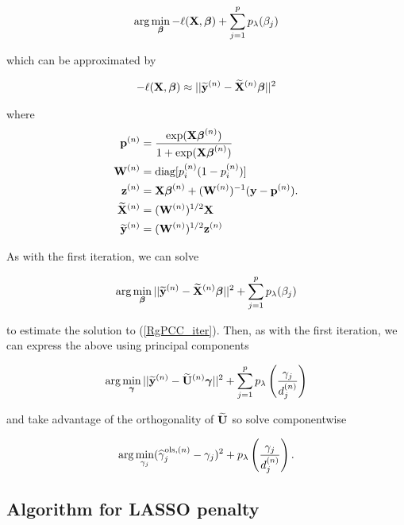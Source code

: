 \documentclass[main.tex]{subfiles}
\begin{document}
\begin{align}
	\text{arg} \min_{\boldsymbol \beta} - \ell(\mathbf{X}, \boldsymbol \beta) + \sum_{j = 1}^p p_{\lambda}(\beta_j)
\end{align}

which can be approximated by

\begin{align}
	- \ell(\mathbf{X}, \boldsymbol \beta) \approx || \widetilde{\mathbf{y}}^{(n)} - \widetilde{\mathbf{X}}^{(n)} \boldsymbol \beta ||^2 \label{RgPCC_iter}
\end{align}

where
\begin{align}
	\mathbf{p}^{(n)} &= \dfrac{\text{exp}(\mathbf{X} \boldsymbol \beta^{(n)})}{1 + \text{exp}(\mathbf{X} \boldsymbol \beta^{(n)})} \label{pdef}\\
    \mathbf{W}^{(n)} &= \text{diag}[p_i^{(n)}(1-p_i^{(n)})] \label{Wdef}\\
    \mathbf{z}^{(n)} &= \mathbf{X} \boldsymbol \beta^{(n)} + (\mathbf{W}^{(n)})^{-1}(\mathbf{y} - \mathbf{p}^{(n)}). \label{zdef} \\
	\widetilde{\mathbf{X}}^{(n)} &= (\mathbf{W}^{(n)})^{1/2} \mathbf{X} \\
	\widetilde{\mathbf{y}}^{(n)} &= (\mathbf{W}^{(n)})^{1/2} \mathbf{z}^{(n)}
\end{align}

As with the first iteration, we can solve

\begin{align}
	\text{arg} \min_{\boldsymbol \beta} || \widetilde{\mathbf{y}}^{(n)} - \widetilde{\mathbf{X}}^{(n)} \boldsymbol \beta ||^2 + \sum_{j = 1}^p p_{\lambda}(\beta_j)
\end{align}

to estimate the solution to (\ref{RgPCC_iter}). Then, as with the first iteration, we can express the above using principal components

\begin{align}
	\text{arg} \min_{\boldsymbol \gamma} ||\widetilde{\mathbf{y}}^{(n)} - \widetilde{\mathbf{U}}^{(n)} \boldsymbol \gamma ||^2 + \sum_{j = 1}^p p_{\lambda} \left (\frac{\gamma_j}{d_j^{(n)}} \right )
\end{align}

and take advantage of the orthogonality of $\widetilde{\mathbf{U}}$ so solve componentwise

\begin{align}
	\text{arg} \min_{\gamma_j} (\widehat{\gamma}_j^{\text{ols}, (n)} - \gamma_j)^2 + p_{\lambda} \left (\frac{\gamma_j}{d_j^{(n)}} \right ). \label{RgPCC_princ_iter}
\end{align}

\subsection{Algorithm for LASSO penalty}
\end{document}
